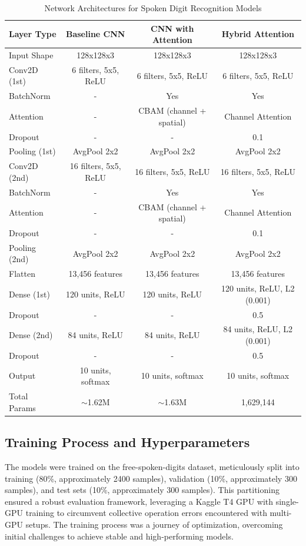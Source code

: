 \documentclass[12pt]{article}
\begin{document}
\begin{table}[h]
    \centering
    \caption{Network Architectures for Spoken Digit Recognition Models}
    \label{tab:architectures_partb}
    \begin{tabular}{lccc}
        \toprule
        \textbf{Layer Type} & \textbf{Baseline CNN} & \textbf{CNN with Attention} & \textbf{Hybrid Attention} \\
        \midrule
        Input Shape & 128x128x3 & 128x128x3 & 128x128x3 \\
        Conv2D (1st) & 6 filters, 5x5, ReLU & 6 filters, 5x5, ReLU & 6 filters, 5x5, ReLU \\
        BatchNorm & - & Yes & Yes \\
        Attention & - & CBAM (channel + spatial) & Channel Attention \\
        Dropout & - & - & 0.1 \\
        Pooling (1st) & AvgPool 2x2 & AvgPool 2x2 & AvgPool 2x2 \\
        Conv2D (2nd) & 16 filters, 5x5, ReLU & 16 filters, 5x5, ReLU & 16 filters, 5x5, ReLU \\
        BatchNorm & - & Yes & Yes \\
        Attention & - & CBAM (channel + spatial) & Channel Attention \\
        Dropout & - & - & 0.1 \\
        Pooling (2nd) & AvgPool 2x2 & AvgPool 2x2 & AvgPool 2x2 \\
        Flatten & 13,456 features & 13,456 features & 13,456 features \\
        Dense (1st) & 120 units, ReLU & 120 units, ReLU & 120 units, ReLU, L2 (0.001) \\
        Dropout & - & - & 0.5 \\
        Dense (2nd) & 84 units, ReLU & 84 units, ReLU & 84 units, ReLU, L2 (0.001) \\
        Dropout & - & - & 0.5 \\
        Output & 10 units, softmax & 10 units, softmax & 10 units, softmax \\
        Total Params & $\sim$1.62M & $\sim$1.63M & 1,629,144 \\
        \bottomrule
    \end{tabular}
\end{table}

\subsection{Training Process and Hyperparameters}
The models were trained on the free-spoken-digits dataset, meticulously split into training (80\%, approximately 2400 samples), validation (10\%, approximately 300 samples), and test sets (10\%, approximately 300 samples). This partitioning ensured a robust evaluation framework, leveraging a Kaggle T4 GPU with single-GPU training to circumvent collective operation errors encountered with multi-GPU setups. The training process was a journey of optimization, overcoming initial challenges to achieve stable and high-performing models.
\end{document}
